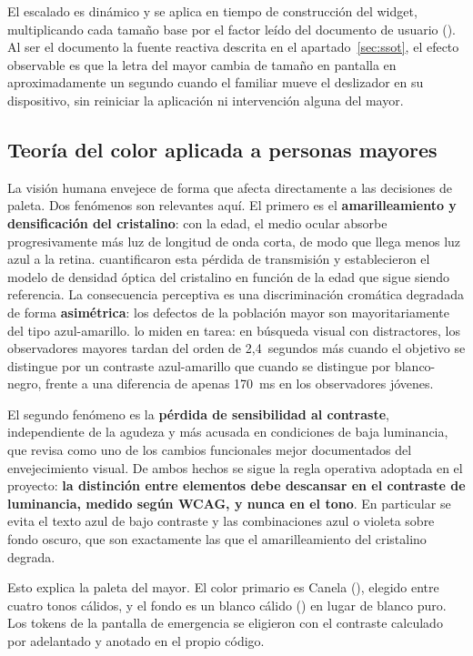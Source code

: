 El escalado es dinámico y se aplica en tiempo de construcción del widget, multiplicando cada tamaño base
por el factor leído del documento de usuario (). Al ser el documento la
fuente reactiva descrita en el apartado~\ref{sec:ssot}, el efecto observable es que la letra del mayor cambia de
tamaño en pantalla en aproximadamente un segundo cuando el familiar mueve el deslizador en su dispositivo,
sin reiniciar la aplicación ni intervención alguna del mayor.

\subsection{Teoría del color aplicada a personas mayores}
\label{sec:color}

La visión humana envejece de forma que afecta directamente a las decisiones de paleta. Dos fenómenos son
relevantes aquí. El primero es el \textbf{amarilleamiento y densificación del cristalino}: con la edad, el
medio ocular absorbe progresivamente más luz de longitud de onda corta, de modo que llega menos luz azul a
la retina. \textcite{Pokorny1987} cuantificaron esta pérdida de transmisión y establecieron el modelo de
densidad óptica del cristalino en función de la edad que sigue siendo referencia. La consecuencia
perceptiva es una discriminación cromática degradada de forma \textbf{asimétrica}: los defectos de la
población mayor son mayoritariamente del tipo azul-amarillo. \textcite{Tamura2020} lo miden en tarea:
en búsqueda visual con distractores, los observadores mayores tardan del orden de 2{,}4~segundos más
cuando el objetivo se distingue por un contraste azul-amarillo que cuando se distingue por
blanco-negro, frente a una diferencia de apenas 170~ms en los observadores jóvenes.

El segundo fenómeno es la \textbf{pérdida de sensibilidad al contraste}, independiente de la agudeza y
más acusada en condiciones de baja luminancia, que \textcite{Owsley2011} revisa como uno de los cambios
funcionales mejor documentados del envejecimiento visual. De ambos hechos se sigue la regla operativa
adoptada en el proyecto: \textbf{la distinción entre elementos debe descansar en el contraste de
luminancia, medido según WCAG, y nunca en el tono}. En particular se evita el texto azul de bajo contraste
y las combinaciones azul o violeta sobre fondo oscuro, que son exactamente las que el amarilleamiento del
cristalino degrada.

Esto explica la paleta del mayor. El color primario es Canela (), elegido entre cuatro tonos
cálidos, y el fondo es un blanco cálido () en lugar de blanco puro. Los tokens de la
pantalla de emergencia se eligieron con el contraste calculado por adelantado y anotado en el propio código.

